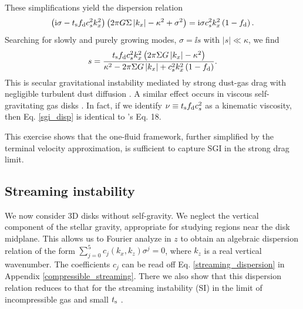 These simplifications yield the dispersion relation
\begin{align*}
  \left(\mathrm{i}\sigma - t_\mathrm{s}f_\mathrm{d} c_s^2k_x^2\right)\left( 2 \pi G
    \Sigma \left|k_x\right|  - \kappa^2 + \sigma^2 \right) = \mathrm{i}
  \sigma c_s^2 k_x^2\left(1 - f_\mathrm{d}\right). 
\end{align*}
Searching for slowly and purely growing modes, $\sigma = \ii s$ with 
$|s|\ll \kappa$, we find 
\begin{align}  
s = \frac{t_\mathrm{s}f_\mathrm{d} c_s^2 k_x^2 \left( 2 \pi \Sigma G
    \left|k_x\right| - \kappa^2\right)}{\kappa^2 -2 \pi \Sigma G
    \left|k_x\right| + c_s^2k_x^2\left(1-f_\mathrm{d}\right) }. \label{sgi_disp}
\end{align}
This is secular gravitational instability mediated by strong
dust-gas drag with negligible turbulent dust diffusion 
\citep[][ their Eq. 13 becomes our Eq. \ref{sgi_disp} in this limit
after 
a change of variables]{takahashi14}. A similar effect occurs in viscous
self-gravitating gas disks \citep{gammie96,lin16}. In fact, if we
identify $\nu \equiv t_\mathrm{s} f_\mathrm{d} c_s^2$ as a kinematic viscosity,
then Eq. \ref{sgi_disp} is identical to \citeauthor{gammie96}'s Eq. 18. 

This exercise shows that the one-fluid framework, further simplified by
the terminal velocity approximation, is sufficient to capture SGI
in the strong drag limit. 

\subsection{Streaming instability}\label{si}
We now consider 3D disks without self-gravity. We neglect the vertical     
component of the stellar gravity, appropriate for studying regions
near the disk midplane. This  
allows us to Fourier analyze in $z$ to obtain 
an algebraic dispersion relation of the form  
$\sum_{j=0}^{5}c_j(k_x,k_z)\sigma^j = 0$, where $k_z$ is a real
vertical wavenumber. The coefficients $c_j$ can be read 
off Eq. \ref{streaming_dispersion} in  Appendix \ref{compressible_streaming}. 
There we also show that this dispersion relation reduces to that for
the streaming instability (SI) in the limit of incompressible gas and small
$t_\mathrm{s}$ \citep{youdin05a,jacquet11}.   
 

